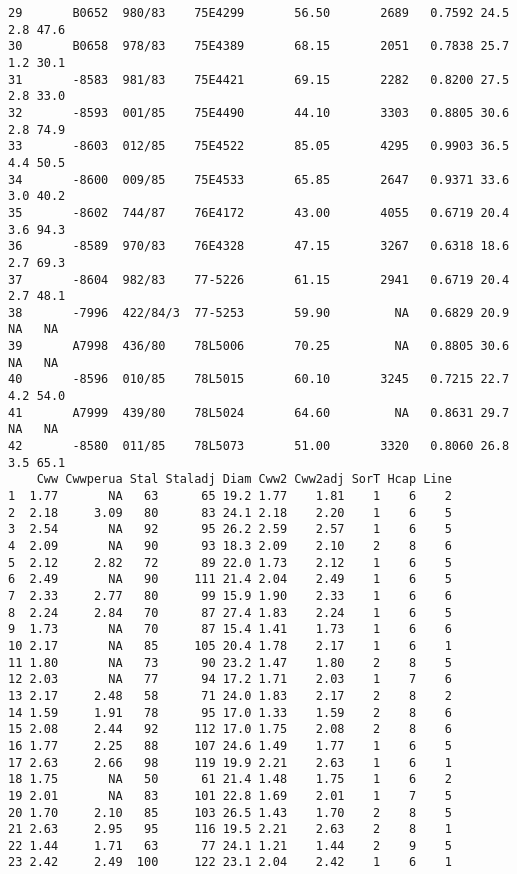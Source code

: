 \documentclass[titlepage]{article}  %
\begin{document}
\begin{verbatim}
29       B0652  980/83    75E4299       56.50       2689   0.7592 24.5 2.8 47.6
30       B0658  978/83    75E4389       68.15       2051   0.7838 25.7 1.2 30.1
31       -8583  981/83    75E4421       69.15       2282   0.8200 27.5 2.8 33.0
32       -8593  001/85    75E4490       44.10       3303   0.8805 30.6 2.8 74.9
33       -8603  012/85    75E4522       85.05       4295   0.9903 36.5 4.4 50.5
34       -8600  009/85    75E4533       65.85       2647   0.9371 33.6 3.0 40.2
35       -8602  744/87    76E4172       43.00       4055   0.6719 20.4 3.6 94.3
36       -8589  970/83    76E4328       47.15       3267   0.6318 18.6 2.7 69.3
37       -8604  982/83    77-5226       61.15       2941   0.6719 20.4 2.7 48.1
38       -7996  422/84/3  77-5253       59.90         NA   0.6829 20.9  NA   NA
39       A7998  436/80    78L5006       70.25         NA   0.8805 30.6  NA   NA
40       -8596  010/85    78L5015       60.10       3245   0.7215 22.7 4.2 54.0
41       A7999  439/80    78L5024       64.60         NA   0.8631 29.7  NA   NA
42       -8580  011/85    78L5073       51.00       3320   0.8060 26.8 3.5 65.1
    Cww Cwwperua Stal Staladj Diam Cww2 Cww2adj SorT Hcap Line
1  1.77       NA   63      65 19.2 1.77    1.81    1    6    2
2  2.18     3.09   80      83 24.1 2.18    2.20    1    6    5
3  2.54       NA   92      95 26.2 2.59    2.57    1    6    5
4  2.09       NA   90      93 18.3 2.09    2.10    2    8    6
5  2.12     2.82   72      89 22.0 1.73    2.12    1    6    5
6  2.49       NA   90     111 21.4 2.04    2.49    1    6    5
7  2.33     2.77   80      99 15.9 1.90    2.33    1    6    6
8  2.24     2.84   70      87 27.4 1.83    2.24    1    6    5
9  1.73       NA   70      87 15.4 1.41    1.73    1    6    6
10 2.17       NA   85     105 20.4 1.78    2.17    1    6    1
11 1.80       NA   73      90 23.2 1.47    1.80    2    8    5
12 2.03       NA   77      94 17.2 1.71    2.03    1    7    6
13 2.17     2.48   58      71 24.0 1.83    2.17    2    8    2
14 1.59     1.91   78      95 17.0 1.33    1.59    2    8    6
15 2.08     2.44   92     112 17.0 1.75    2.08    2    8    6
16 1.77     2.25   88     107 24.6 1.49    1.77    1    6    5
17 2.63     2.66   98     119 19.9 2.21    2.63    1    6    1
18 1.75       NA   50      61 21.4 1.48    1.75    1    6    2
19 2.01       NA   83     101 22.8 1.69    2.01    1    7    5
20 1.70     2.10   85     103 26.5 1.43    1.70    2    8    5
21 2.63     2.95   95     116 19.5 2.21    2.63    2    8    1
22 1.44     1.71   63      77 24.1 1.21    1.44    2    9    5
23 2.42     2.49  100     122 23.1 2.04    2.42    1    6    1

\end{verbatim}
\end{document}
